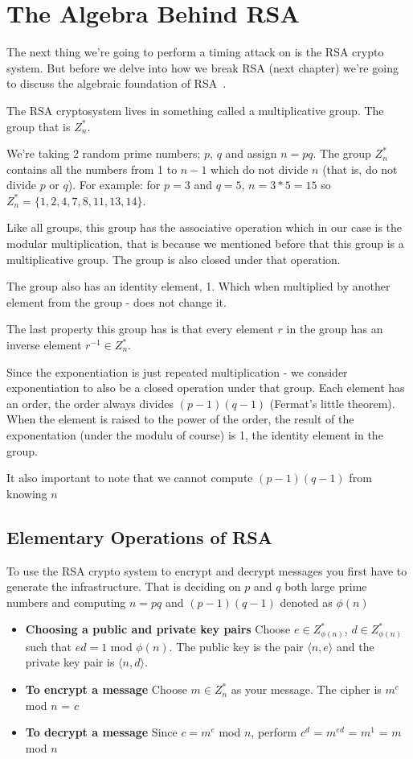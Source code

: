\section{The Algebra Behind RSA}
The next thing we're going to perform a timing attack on is the RSA crypto
system. But before we delve into how we break RSA (next chapter) we're going to
discuss the algebraic foundation of RSA~\cite{kaliski2006mathematics}.

The RSA cryptosystem lives in something called a multiplicative group. The group
that is $Z^{*}_n$.

We're taking 2 random prime numbers; $p$, $q$ and assign $n=pq$. The group
$Z^{*}_n$ contains all the numbers from 1 to $n-1$ which do not divide $n$ (that
is, do not divide $p$ or $q$). For example: for $p=3$ and $q=5$, $n= 3*5 = 15$
so $Z^{*}_n = {\{1,2,4,7,8,11,13,14\}}$.

Like all groups, this group has the associative operation which in our case is
the modular multiplication, that is because we mentioned before that this group
is a multiplicative group. The group is also closed under that operation.

The group also has an identity element, 1. Which when multiplied by another
element from the group - does not change it.

The last property this group has is that every element $r$ in the group has an
inverse element $r^{-1} \in Z^{*}_n$.

Since the exponentiation is just repeated multiplication - we consider
exponentiation to also be a closed operation under that group. Each element has
an order, the order always divides $(p-1)(q-1)$ (Fermat's little theorem). When
the element is raised to the power of the order, the result of the exponentation
(under the modulu of course) is 1, the identity element in the group.

It also important to note that we cannot compute $(p-1)(q-1)$ from knowing $n$

\subsection{Elementary Operations of RSA}
To use the RSA crypto system to encrypt and decrypt messages you first have to
generate the infrastructure. That is deciding on $p$ and $q$ both large prime
numbers and computing $n = pq$ and $(p-1)(q-1)$ denoted as $\phi(n)$

\begin{itemize}
    \item \textbf{Choosing a public and private key pairs}
    Choose $e \in Z^{*}_{\phi(n)}$, $d \in Z^{*}_{\phi(n)}$ such that $ed = 1$
    mod $\phi(n)$. The public key is the pair $\langle{n,e}\rangle$  and the
    private key pair is  $\langle{n,d}\rangle$.
    \item \textbf{To encrypt a message}
    Choose $m \in Z^{*}_n$ as your message. The cipher is $m^{e}$ mod $n$ = $c$
    \item \textbf{To decrypt a message}
    Since $c = m^{e}$ mod $n$, perform $c^{d}$ = $m^{ed}$ = $m^{1}$ = $m$ mod
    $n$
\end{itemize}

